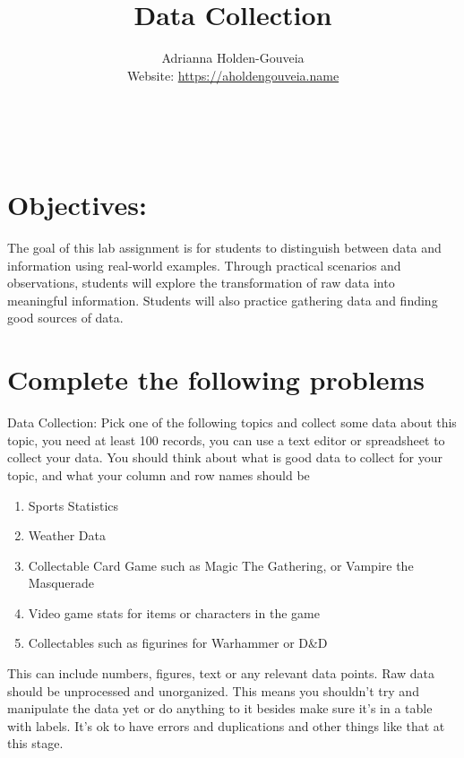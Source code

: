 \documentclass[12pt]{article}
\title{Data Collection}
\author{
        Adrianna Holden-Gouveia \\
        Website: \url{https://aholdengouveia.name}\\ 
        \date{\vspace{-5ex}}
        \faLinkedin{: aholdengouveia} \\
        \faGithub {: aholdengouveia} \\
        }
\begin{document}
    

\maketitle


\section*{Objectives:}
    The goal of this lab assignment is for students to distinguish between data and information using real-world examples. Through practical scenarios and observations, students will explore the transformation of raw data into meaningful information.  Students will also practice gathering data and finding good sources of data.
    


\section*{Complete the following problems}
Data Collection:
Pick one of the following topics and collect some data about this topic, you need at least 100 records, you can use a text editor or spreadsheet to collect your data.  You should think about what is good data to collect for your topic, and what your column and row names should be

\begin{enumerate}
    \item Sports Statistics
    \item Weather Data
    \item Collectable Card Game such as Magic The Gathering, or Vampire the Masquerade
    \item Video game stats for items or characters in the game
    \item Collectables such as figurines for Warhammer or D\&D
\end{enumerate}

This can include numbers, figures, text or any relevant data points. Raw data should be unprocessed and unorganized.  This means you shouldn't try and manipulate the data yet or do anything to it besides make sure it's in a table with labels. It's ok to have errors and duplications and other things like that at this stage. 
\end{document}
